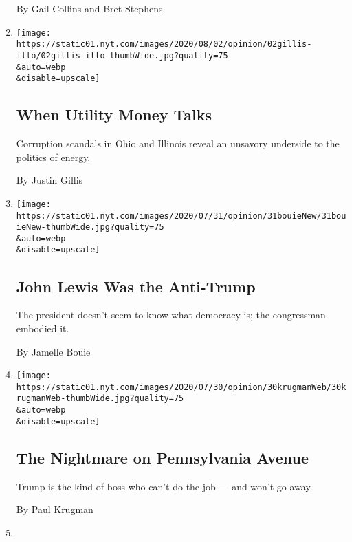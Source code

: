 \begin{enumerate}
  By Gail Collins and Bret Stephens
\item
  \href{/2020/08/02/opinion/utility-corruption-energy.html}{}

  \texttt{[image: https://static01.nyt.com/images/2020/08/02/opinion/02gillis-illo/02gillis-illo-thumbWide.jpg?quality=75\\\&auto=webp\\\&disable=upscale]}

  \hypertarget{when-utility-money-talks}{%
  \subsection{When Utility Money Talks}\label{when-utility-money-talks}}

  Corruption scandals in Ohio and Illinois reveal an unsavory underside
  to the politics of energy.

  By Justin Gillis
\item
  \href{/2020/07/31/opinion/sunday/john-lewis-trump-election-2020.html}{}

  \texttt{[image: https://static01.nyt.com/images/2020/07/31/opinion/31bouieNew/31bouieNew-thumbWide.jpg?quality=75\\\&auto=webp\\\&disable=upscale]}

  \hypertarget{john-lewis-was-the-anti-trump}{%
  \subsection{John Lewis Was the
  Anti-Trump}\label{john-lewis-was-the-anti-trump}}

  The president doesn't seem to know what democracy is; the congressman
  embodied it.

  By Jamelle Bouie
\item
  \href{/2020/07/30/opinion/trump-coronavirus-economy.html}{}

  \texttt{[image: https://static01.nyt.com/images/2020/07/30/opinion/30krugmanWeb/30krugmanWeb-thumbWide.jpg?quality=75\\\&auto=webp\\\&disable=upscale]}

  \hypertarget{the-nightmare-on-pennsylvania-avenue}{%
  \subsection{The Nightmare on Pennsylvania
  Avenue}\label{the-nightmare-on-pennsylvania-avenue}}

  Trump is the kind of boss who can't do the job --- and won't go away.

  By Paul Krugman
\item
  \href{/2020/07/30/opinion/trump-delay-election-coronavirus.html}{}


\end{enumerate}
